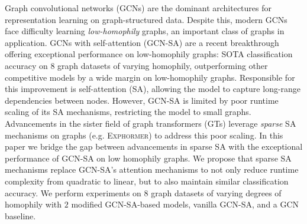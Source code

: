 Graph convolutional networks (GCNs)
are the dominant architectures for 
representation learning on graph-structured data.
Despite this, modern GCNs
face difficulty learning \emph{low-homophily} graphs,
an important class of graphs in application.
GCNs with self-attention (\textsc{GCN-SA})
are a recent breakthrough
offering exceptional performance on low-homophily graphs:
SOTA classification accuracy on 8 graph datasets
of varying homophily,
outperforming other competitive models 
by a wide margin on low-homophily graphs.
Responsible for this improvement is self-attention (SA),
allowing the model to capture long-range dependencies between nodes.
However, \textsc{GCN-SA} is limited by poor
runtime scaling of its SA mechanisms,
restricting the model to small graphs.
Advancements in the sister field of graph transformers (GTs)
leverage \emph{sparse} 
SA mechanisms on graphs (e.g. \textsc{Exphormer})
to address this poor scaling.
In this paper we bridge the gap between 
advancements in sparse SA 
with the exceptional performance of GCN-SA
on low homophily graphs.
We propose that sparse SA mechanisms replace 
GCN-SA's attention mechanisms 
to not only reduce runtime complexity from quadratic to linear,
but to also maintain similar classification accuracy.
We perform experiments on 8 graph datasets
of varying degrees of homophily
with $ 2 $ modified GCN-SA-based models,
vanilla GCN-SA, 
and a GCN baseline.
